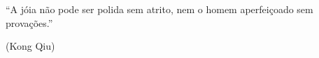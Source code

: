 \begin{epigrafe}
    \vspace*{\fill}
{%
	\noindent\hspace{.5\textwidth}
	{\begin{minipage}{.5\textwidth}
		\begin{flushright}
			``A jóia não pode ser polida sem atrito, nem o homem aperfeiçoado sem provações.'' 
            
            (Kong Qiu)
		\end{flushright}
	\end{minipage}}%
	\vspace*{3cm}
}%
\end{epigrafe}
